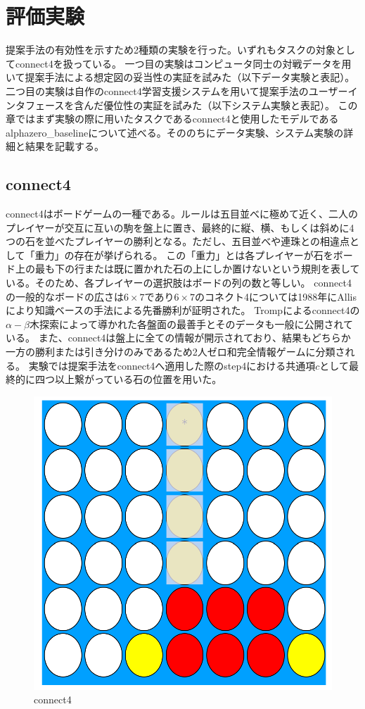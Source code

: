 \chapter{評価実験}
提案手法の有効性を示すため2種類の実験を行った。いずれもタスクの対象としてconnect4を扱っている。
一つ目の実験はコンピュータ同士の対戦データを用いて提案手法による想定図の妥当性の実証を試みた（以下データ実験と表記）。
二つ目の実験は自作のconnect4学習支援システムを用いて提案手法のユーザーインタフェースを含んだ優位性の実証を試みた（以下システム実験と表記）。
この章ではまず実験の際に用いたタスクであるconnect4と使用したモデルであるalphazero\_baselineについて述べる。そののちにデータ実験、システム実験の詳細と結果を記載する。
\section{connect4\cite{connect4}}
connect4はボードゲームの一種である。ルールは五目並べに極めて近く、二人のプレイヤーが交互に互いの駒を盤上に置き、最終的に縦、横、もしくは斜めに4つの石を並べたプレイヤーの勝利となる。ただし、五目並べや連珠との相違点として「重力」の存在が挙げられる。
この「重力」とは各プレイヤーが石をボード上の最も下の行または既に置かれた石の上にしか置けないという規則を表している。そのため、各プレイヤーの選択肢はボードの列の数と等しい。
connect4の一般的なボードの広さは$6\times7$であり$6\times7$のコネクト4については1988年にAllis\cite{allis}により知識ベースの手法による先番勝利が証明された。
Tromp\cite{data}によるconnect4の$\alpha-\beta$木探索によって導かれた各盤面の最善手とそのデータも一般に公開されている。
また、connect4は盤上に全ての情報が開示されており、結果もどちらか一方の勝利または引き分けのみであるため2人ゼロ和完全情報ゲームに分類される。
実験では提案手法をconnect4へ適用した際のstep4における共通項$c$として最終的に四つ以上繋がっている石の位置を用いた。
\begin{figure}[t]
	\centering
	\includegraphics[width=\linewidth]{./figure/connect4.png}
	\caption{connect4}
	\label{fig:connect4}
\end{figure}
